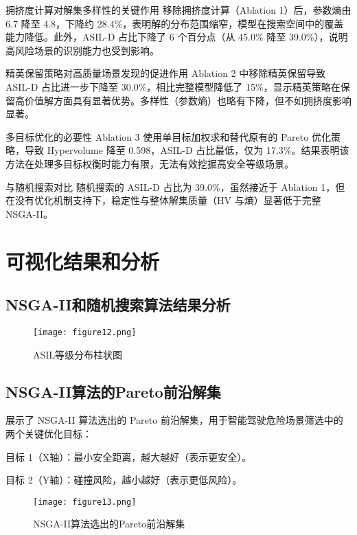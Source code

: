 拥挤度计算对解集多样性的关键作用
移除拥挤度计算（Ablation 1）后，参数熵由 6.7 降至 4.8，下降约 28.4\%，表明解的分布范围缩窄，模型在搜索空间中的覆盖能力降低。此外，ASIL-D 占比下降了 6 个百分点（从 45.0\% 降至 39.0\%），说明高风险场景的识别能力也受到影响。

精英保留策略对高质量场景发现的促进作用
Ablation 2 中移除精英保留导致 ASIL-D 占比进一步下降至 30.0\%，相比完整模型降低了 15\%，显示精英策略在保留高价值解方面具有显著优势。多样性（参数熵）也略有下降，但不如拥挤度影响显著。

多目标优化的必要性
Ablation 3 使用单目标加权求和替代原有的 Pareto 优化策略，导致 Hypervolume 降至 0.598，ASIL-D 占比最低，仅为 17.3\%。结果表明该方法在处理多目标权衡时能力有限，无法有效挖掘高安全等级场景。

与随机搜索对比
随机搜索的 ASIL-D 占比为 39.0\%，虽然接近于 Ablation 1，但在没有优化机制支持下，稳定性与整体解集质量（HV 与熵）显著低于完整 NSGA-II。
\section{可视化结果和分析}
\subsection{NSGA-II和随机搜索算法结果分析}


\begin{figure}[htbp]
	\centering
	\texttt{[image: figure12.png]}%
	\caption{ASIL等级分布柱状图} %
	\label{fig:example} %
\end{figure}
\subsection{NSGA-II算法的Pareto前沿解集}
展示了 NSGA-II 算法选出的 Pareto 前沿解集，用于智能驾驶危险场景筛选中的两个关键优化目标：

目标 1（X轴）：最小安全距离，越大越好（表示更安全）。

目标 2（Y轴）：碰撞风险，越小越好（表示更低风险）。

\begin{figure}[htbp]
	\centering
	\texttt{[image: figure13.png]}%
	\caption{NSGA-II算法选出的Pareto前沿解集} %
	\label{fig:example} %
\end{figure}

\newpage





